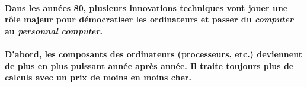 \paragraph{
  Dans les années 80, plusieurs innovations techniques vont jouer une rôle majeur pour démocratiser les ordinateurs et passer du \textit{computer} au \textit{personnal computer}.
}

\paragraph{
  D'abord, les composants des ordinateurs (processeurs, etc.) deviennent de plus en plus puissant année après année. Il traite toujours plus de calculs avec un prix de moins en moins cher.
}
